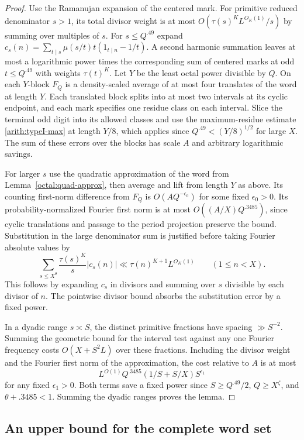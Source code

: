 \documentclass[11pt,a4paper]{article}
\theoremstyle{paperplain}
\numberwithin{equation}{section}
\begin{document}
\begin{proof}
Use the Ramanujan expansion of the centered mark. For primitive
reduced denominator $s>1$, its total divisor weight is at most
$O(\tau(s)^K L^{O_K(1)}/s)$ by summing over multiples of $s$.
For $s\le Q^{.49}$ expand
$c_s(n)=\sum_{t\mid s}\mu(s/t)t(1_{t\mid n}-1/t)$.
A second harmonic summation leaves at most a logarithmic power
times the corresponding sum of centered marks at odd $t\le Q^{.49}$
with weights $\tau(t)^K$.
Let $Y$ be the least octal power divisible by $Q$. On each
$Y$-block $F_Q$ is a density-scaled average of at most four
translates of the word at length $Y$. Each translated block
splits into at most two intervals at its cyclic endpoint, and
each mark specifies one residue class on each interval.
Slice the terminal odd digit into its allowed classes and use
the maximum-residue estimate \eqref{arith:typeI-max} at
length $Y/8$, which applies since $Q^{.49}<(Y/8)^{1/2}$ for
large $X$. The sum of these errors over the blocks has scale $A$
and arbitrary logarithmic savings.

For larger $s$ use the quadratic approximation of the word
from Lemma~\ref{octal:quad-approx}, then average and lift
from length $Y$ as above. Its counting first-norm difference
from $F_Q$ is $O(AQ^{-\epsilon_0})$ for some fixed $\epsilon_0>0$.
Its probability-normalized Fourier first norm is at most
$O((A/X)Q^{.3485})$, since cyclic translations and passage to
the period projection preserve the bound. Substitution in the large denominator
sum is justified before taking Fourier absolute values by
\[
 \sum_{s\le X^\theta}\frac{\tau(s)^K}{s}|c_s(n)|
    \ll \tau(n)^{K+1}L^{O_K(1)}\qquad (1\le n<X).
\]
This follows by expanding $c_s$ in divisors and summing over
$s$ divisible by each divisor of $n$. The pointwise divisor
bound absorbs the substitution error by a fixed power.

In a dyadic range $s\asymp S$, the distinct primitive fractions
have spacing $\gg S^{-2}$. Summing the geometric bound for the
interval test against any one Fourier frequency costs
$O(X+S^2 L)$ over these fractions. Including the divisor weight
and the Fourier first norm of the approximation, the cost
relative to $A$ is at most
\[
 L^{O(1)} Q^{.3485} (1/S+S/X) S^{\epsilon_1}
\]
for any fixed $\epsilon_1>0$. Both terms save a fixed power
since $S\ge Q^{.49}/2$, $Q\ge X^\zeta$, and
$\theta+.3485<1$. Summing the dyadic ranges proves the lemma.
\end{proof}


\subsection{An upper bound for the complete word set}\label{sec:upper-all}
\end{document}
